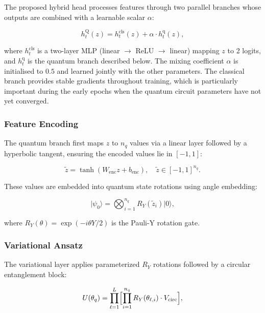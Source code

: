 \documentclass[acmlarge]{acmart}
\begin{document}
The proposed hybrid head processes features through two parallel branches whose outputs are combined with a learnable scalar $\alpha$:

\begin{equation}
\label{eq:dual_path}
h_t^{\text{Q}}(z) = h_t^{\text{cls}}(z) + \alpha \cdot h_t^{\text{q}}(z),
\end{equation}

where $h_t^{\text{cls}}$ is a two-layer MLP (linear $\to$ ReLU $\to$ linear) mapping $z$ to 2 logits, and $h_t^{\text{q}}$ is the quantum branch described below.
The mixing coefficient $\alpha$ is initialised to $0.5$ and learned jointly with the other parameters.
The classical branch provides stable gradients throughout training, which is particularly important during the early epochs when the quantum circuit parameters have not yet converged.

\subsubsection{Feature Encoding}

The quantum branch first maps $z$ to $n_q$ values via a linear layer followed by a hyperbolic tangent, ensuring the encoded values lie in $[-1, 1]$:

\begin{equation}
\label{eq:encoding}
\tilde{z} = \tanh(W_{\text{enc}} z + b_{\text{enc}}), \quad \tilde{z} \in [-1,1]^{n_q}.
\end{equation}

These values are embedded into quantum state rotations using angle embedding:

\begin{equation}
\label{eq:angle_embedding}
\vert \psi_0 \rangle = \bigotimes_{i=1}^{n_q} R_Y(\tilde{z}_i) \vert 0 \rangle,
\end{equation}

where $R_Y(\theta) = \exp(-i\theta Y / 2)$ is the Pauli-Y rotation gate.

\subsubsection{Variational Ansatz}

The variational layer applies parameterized $R_Y$ rotations followed by a circular entanglement block:

\begin{equation}
\label{eq:vqc}
U(\theta_q) = \prod_{\ell=1}^{L} \Bigl[ \prod_{i=1}^{n_q} R_Y(\theta_{\ell,i}) \cdot V_{\text{circ}} \Bigr],
\end{equation}
\end{document}
